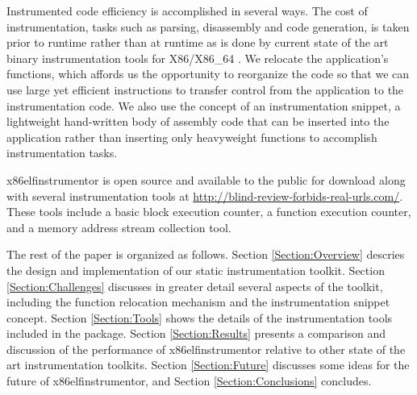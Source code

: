 Instrumented code efficiency is accomplished in several ways. The cost of
instrumentation, tasks such as parsing, disassembly and code generation, is
taken prior to runtime rather than at runtime as is done by current state of the
art binary instrumentation tools for X86/X86\_64 \cite{luk2005pin,
nethercote2007valgrind, dynamorio}. We relocate the application's
functions, which affords us the opportunity to reorganize the code so that we
can use large yet efficient instructions to transfer control from the
application to the instrumentation code. We also use the concept of an
instrumentation snippet, a lightweight hand-written body of assembly code that can
be inserted into the application rather than inserting only heavyweight
functions to accomplish instrumentation tasks.

x86elfinstrumentor is open source and available to the public for download along with several
instrumentation tools at \url{http://blind-review-forbids-real-urls.com/}. These tools include a basic block
execution counter, a function execution counter, and a memory address stream collection tool.

The rest of the paper is organized as follows. Section
\ref{Section:Overview} descries the design and implementation of our static
instrumentation toolkit. Section \ref{Section:Challenges} discusses in greater detail
several aspects of the toolkit, including the function relocation mechanism and the
instrumentation snippet concept. Section \ref{Section:Tools} shows the details of
the instrumentation tools included in the package. Section \ref{Section:Results}
presents a comparison and discussion of the performance of x86elfinstrumentor relative
to other state of the art instrumentation toolkits. Section
\ref{Section:Future} discusses some ideas for the future of x86elfinstrumentor,
and Section \ref{Section:Conclusions} concludes.
